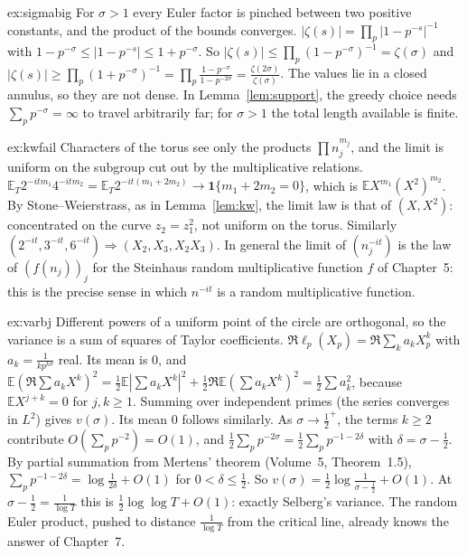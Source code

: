 \begin{solution}{ex:sigmabig}
\idea For $\sigma>1$ every Euler factor is pinched between two positive constants, and the product of the bounds converges.
\writeup $|\zeta(s)|=\prod_p|1-p^{-s}|^{-1}$ with $1-p^{-\sigma}\le|1-p^{-s}|\le1+p^{-\sigma}$. So $|\zeta(s)|\le\prod_p(1-p^{-\sigma})^{-1}=\zeta(\sigma)$ and $|\zeta(s)|\ge\prod_p(1+p^{-\sigma})^{-1}=\prod_p\frac{1-p^{-\sigma}}{1-p^{-2\sigma}}=\frac{\zeta(2\sigma)}{\zeta(\sigma)}$. The values lie in a closed annulus, so they are not dense. In Lemma~\ref{lem:support}, the greedy choice needs $\sum_pp^{-\sigma}=\infty$ to travel arbitrarily far; for $\sigma>1$ the total length available is finite.
\end{solution}

\begin{solution}{ex:kwfail}
\idea Characters of the torus see only the products $\prod n_j^{m_j}$, and the limit is uniform on the subgroup cut out by the multiplicative relations.
\writeup $\mathbb E_T2^{-itm_1}4^{-itm_2}=\mathbb E_T2^{-it(m_1+2m_2)}\to\mathbf 1\{m_1+2m_2=0\}$, which is $\mathbb EX^{m_1}(X^2)^{m_2}$. By Stone--Weierstrass, as in Lemma~\ref{lem:kw}, the limit law is that of $(X,X^2)$: concentrated on the curve $z_2=z_1^2$, not uniform on the torus. Similarly $(2^{-it},3^{-it},6^{-it})\Rightarrow(X_2,X_3,X_2X_3)$. In general the limit of $(n_j^{-it})$ is the law of $(f(n_j))_j$ for the Steinhaus random multiplicative function $f$ of Chapter~5: this is the precise sense in which $n^{-it}$ is a random multiplicative function.
\end{solution}

\begin{solution}{ex:varbj}
\idea Different powers of a uniform point of the circle are orthogonal, so the variance is a sum of squares of Taylor coefficients.
\writeup $\Re\ell_p(X_p)=\Re\sum_ka_kX_p^k$ with $a_k=\frac1{kp^{k\sigma}}$ real. Its mean is $0$, and $\mathbb E(\Re\sum a_kX^k)^2=\frac12\mathbb E|\sum a_kX^k|^2+\frac12\Re\mathbb E(\sum a_kX^k)^2=\frac12\sum a_k^2$, because $\mathbb EX^{j+k}=0$ for $j,k\ge1$. Summing over independent primes (the series converges in $L^2$) gives $v(\sigma)$. Its mean $0$ follows similarly. As $\sigma\to\frac12^+$, the terms $k\ge2$ contribute $O(\sum_pp^{-2})=O(1)$, and $\frac12\sum_pp^{-2\sigma}=\frac12\sum_pp^{-1-2\delta}$ with $\delta=\sigma-\frac12$. By partial summation from Mertens' theorem (Volume~5, Theorem~1.5), $\sum_pp^{-1-2\delta}=\log\frac1{2\delta}+O(1)$ for $0<\delta\le\frac12$. So $v(\sigma)=\frac12\log\frac1{\sigma-\frac12}+O(1)$. At $\sigma-\frac12=\frac1{\log T}$ this is $\frac12\log\log T+O(1)$: exactly Selberg's variance. The random Euler product, pushed to distance $\frac1{\log T}$ from the critical line, already knows the answer of Chapter~7.
\end{solution}

